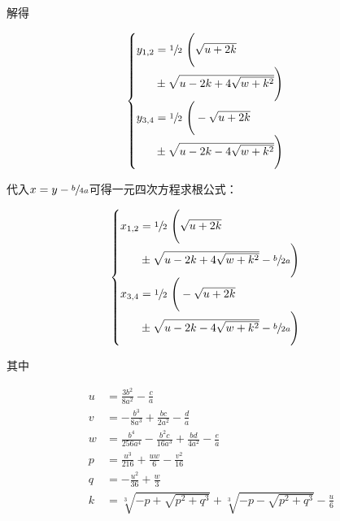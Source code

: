 解得

\begin{align*}
  \begin{cases}
    y_{1,2} = \sfrac12\ \Bigg(\sqrt{u + 2k} \\
    \phantom{y_{1,2}} \pm\sqrt{u - 2k + 4\sqrt{w + k^2}}\Bigg) \\
    y_{3,4} = \sfrac12\ \Bigg(-\sqrt{u + 2k} \\
    \phantom{y_{3,4}} \pm\sqrt{u - 2k - 4\sqrt{w + k^2}}\Bigg) \\
  \end{cases}
\end{align*}

代入$x = y - \sfrac b{4a}$可得一元四次方程求根公式：

\begin{align*}
  \begin{cases}
    x_{1,2} = \sfrac12\ \Bigg(\sqrt{u + 2k} \\
    \phantom{x_{1,2}} \pm\sqrt{u - 2k + 4\sqrt{w + k^2}} - \sfrac b{2a}\Bigg) \\
    x_{3,4} = \sfrac12\ \Bigg(-\sqrt{u + 2k} \\
    \phantom{x_{3,4}} \pm\sqrt{u - 2k - 4\sqrt{w + k^2}} - \sfrac b{2a}\Bigg) \\
  \end{cases}
\end{align*}

其中

\begin{align*}
  u &= \frac{3b^2}{8a^2} - \frac ca \\
  v &= -\frac{b^3}{8a^3} + \frac{bc}{2a^2} - \frac da \\
  w &= \frac{b^4}{256a^4} - \frac{b^2c}{16a^3} + \frac{bd}{4a^2} - \frac ea \\
  p &= \frac{u^3}{216} + \frac{uw}6 - \frac{v^2}{16} \\
  q &= -\frac{u^2}{36} + \frac w3 \\
  k &= \sqrt[3]{-p + \sqrt{p^2 + q^3}} + \sqrt[3]{-p - \sqrt{p^2 + q^3}} - \frac u6 \\
\end{align*}

